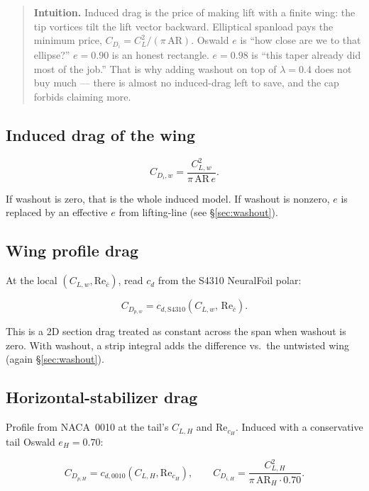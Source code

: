 \documentclass[11pt,letterpaper]{article}
\newenvironment{intuition}{\begin{quote}\small}{\end{quote}}
\begin{document}
\begin{intuition}
\textbf{Intuition.} Induced drag is the price of making lift with a finite wing: the tip vortices tilt the lift vector backward. Elliptical spanload pays the minimum price, $C_{D_i} = C_L^2/(\pi\,\mathrm{AR})$. Oswald $e$ is ``how close are we to that ellipse?'' $e=0.90$ is an honest rectangle. $e=0.98$ is ``this taper already did most of the job.'' That is why adding washout on top of $\lambda=0.4$ does not buy much --- there is almost no induced-drag left to save, and the cap forbids claiming more.
\end{intuition}

\subsection{Induced drag of the wing}

\begin{equation}
  C_{D_i,w} = \frac{C_{L,w}^2}{\pi\,\mathrm{AR}\, e}.
\label{eq:cdi}
\end{equation}

If washout is zero, that is the whole induced model. If washout is nonzero, $e$ is replaced by an effective $e$ from lifting-line (see \S\ref{sec:washout}).

\subsection{Wing profile drag}

At the local $(C_{L,w}, \mathrm{Re}_{\bar{c}})$, read $c_d$ from the S4310 NeuralFoil polar:

\begin{equation}
  C_{D_{p,w}} = c_{d,\mathrm{S4310}}\!\left(C_{L,w},\, \mathrm{Re}_{\bar{c}}\right).
\end{equation}

This is a 2D section drag treated as constant across the span when washout is zero. With washout, a strip integral adds the difference vs.\ the untwisted wing (again \S\ref{sec:washout}).

\subsection{Horizontal-stabilizer drag}

Profile from NACA~0010 at the tail's $C_{L,H}$ and $\mathrm{Re}_{c_H}$. Induced with a conservative tail Oswald $e_H = 0.70$:

\begin{equation}
  C_{D_{p,H}} = c_{d,0010}(C_{L,H}, \mathrm{Re}_{c_H}), \qquad
  C_{D_{i,H}} = \frac{C_{L,H}^2}{\pi\,\mathrm{AR}_H \cdot 0.70}.
\end{equation}
\end{document}
